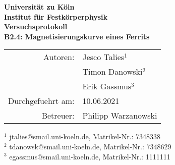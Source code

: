 \documentclass{article}
\begin{document}
 
 
\thispagestyle{empty}
\vspace*{\fill}
\begin{center}
	\Huge
	\textbf{Universität zu Köln}\\
	\LARGE
	\textbf{Institut für Festkörperphysik}\\
	\vspace{2cm}
	\textbf{Versuchsprotokoll}\\  
	\vspace{0.5cm}
	\large
	\textbf{B2.4: Magnetisierungskurve eines Ferrits}\\
	\normalsize
	\vspace{2cm}
	\begin{tabular}{r l}
		Autoren: 	& Jesco Talies$^1$\\
					& Timon Danowski$^2$\\
                    & Erik Gassmus$^3$\\
		Durchgefuehrt am:	& 10.06.2021\\
		Betreuer:	& Philipp Warzanowski
	\end{tabular}
\end{center}
\vfill\footnotesize
$^1$ jtalies@smail.uni-koeln.de, Matrikel-Nr.:  7348338\\
$^2$ tdanowsk@smail.uni-koeln.de, Matrikel-Nr.: 7348629\\
$^3$ egassmus@smail.uni-koeln.de, Matrikel-Nr.: 1111111\\
\normalsize

\newpage
\thispagestyle{empty}
\tableofcontents
\clearpage
\setcounter{page}{1}
  
   
  

% 




\end{document}
